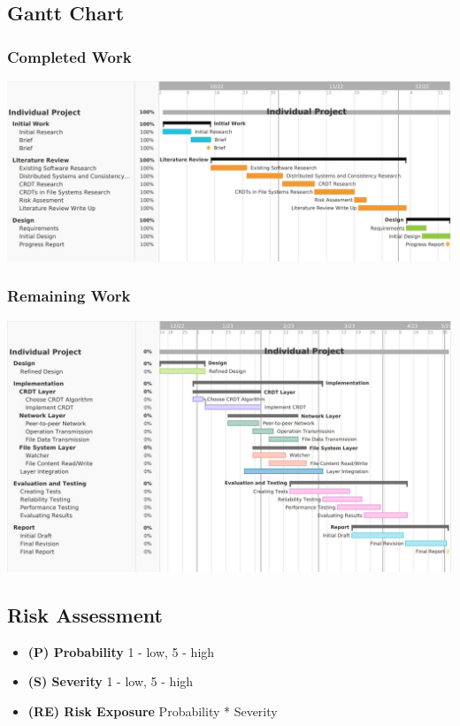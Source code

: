 \documentclass[12pt]{article}
\begin{document}
\subsection{Gantt Chart}

\subsubsection{Completed Work}
\includegraphics[width=16cm]{completed.jpg}


\subsubsection{Remaining Work}
\begin{center}
    \includegraphics[width=16cm]{remaining.jpg}
\end{center}


\subsection{Risk Assessment}

\begin{itemize}
    \item \textbf{(P) Probability} 1 - low, 5 - high
    \item \textbf{(S) Severity}  1 - low, 5 - high
    \item \textbf{(RE) Risk Exposure} Probability * Severity
\end{itemize}
\end{document}
